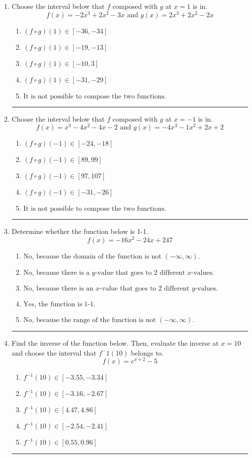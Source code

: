 \documentclass[14pt]{extbook}
\newcommand{\litem}[1]{\item#1\hspace*{-1cm}\rule{\textwidth}{0.4pt}}
\begin{document}
\begin{enumerate}
\litem{
Choose the interval below that $f$ composed with $g$ at $x=1$ is in.\[ f(x) = -2x^{3} +2 x^{2} -3 x \text{ and } g(x) = 2x^{3} +2 x^{2} -2 x \]\begin{enumerate}[label=\Alph*.]
\item \( (f \circ g)(1) \in [-36, -34] \)
\item \( (f \circ g)(1) \in [-19, -13] \)
\item \( (f \circ g)(1) \in [-10, 3] \)
\item \( (f \circ g)(1) \in [-31, -29] \)
\item \( \text{It is not possible to compose the two functions.} \)

\end{enumerate} }
\litem{
Choose the interval below that $f$ composed with $g$ at $x=-1$ is in.\[ f(x) = x^{3} -4 x^{2} -4 x -2 \text{ and } g(x) = -4x^{3} -1 x^{2} +2 x + 2 \]\begin{enumerate}[label=\Alph*.]
\item \( (f \circ g)(-1) \in [-24, -18] \)
\item \( (f \circ g)(-1) \in [89, 99] \)
\item \( (f \circ g)(-1) \in [97, 107] \)
\item \( (f \circ g)(-1) \in [-31, -26] \)
\item \( \text{It is not possible to compose the two functions.} \)

\end{enumerate} }
\litem{
Determine whether the function below is 1-1.\[ f(x) = -16 x^2 - 24 x + 247 \]\begin{enumerate}[label=\Alph*.]
\item \( \text{No, because the domain of the function is not $(-\infty, \infty)$.} \)
\item \( \text{No, because there is a $y$-value that goes to 2 different $x$-values.} \)
\item \( \text{No, because there is an $x$-value that goes to 2 different $y$-values.} \)
\item \( \text{Yes, the function is 1-1.} \)
\item \( \text{No, because the range of the function is not $(-\infty, \infty)$.} \)

\end{enumerate} }
\litem{
Find the inverse of the function below. Then, evaluate the inverse at $x = 10$ and choose the interval that $f^-1(10)$ belongs to.\[ f(x) = e^{x+2}-5 \]\begin{enumerate}[label=\Alph*.]
\item \( f^{-1}(10) \in [-3.55, -3.34] \)
\item \( f^{-1}(10) \in [-3.16, -2.67] \)
\item \( f^{-1}(10) \in [4.47, 4.86] \)
\item \( f^{-1}(10) \in [-2.54, -2.41] \)
\item \( f^{-1}(10) \in [0.55, 0.96] \)


\end{enumerate}}
\end{enumerate}
\end{document}
